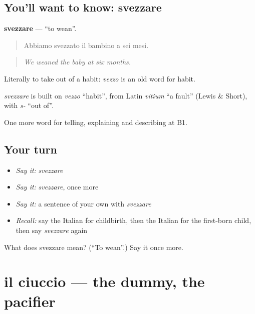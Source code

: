 \subsection*{You'll want to know: svezzare}
\textbf{svezzare} — \textquotedblleft{}to wean\textquotedblright{}.

\begin{quote}
Abbiamo svezzato il bambino a sei mesi.
\end{quote}

\begin{quote}
\emph{We weaned the baby at six months.}
\end{quote}

Literally to take out of a habit: \emph{vezzo} is an old word for habit.

\begin{cousinweb}
\emph{svezzare} is built on \emph{vezzo} \textquotedblleft{}habit\textquotedblright{}, from Latin \emph{vitium} \textquotedblleft{}a fault\textquotedblright{} (Lewis \& Short), with \emph{s-} \textquotedblleft{}out of\textquotedblright{}.
\end{cousinweb}

\begin{grammarlens}[title={What you've built}]
One more word for telling, explaining and describing at B1.
\end{grammarlens}

\subsection*{Your turn}
\begin{itemize}
\raggedright
  \item \emph{Say it:} \emph{svezzare}
  \item \emph{Say it:} \emph{svezzare}, once more
  \item \emph{Say it:} a sentence of your own with \emph{svezzare}
  \item \emph{Recall:} say the Italian for childbirth, then the Italian for the first-born child, then say \emph{svezzare} again
\end{itemize}

\begin{tcolorbox}[breakable,colback=teal!4,colframe=teal!35!black,title={Before you move on}]
What does svezzare mean? (\textquotedblleft{}To wean\textquotedblright{}.) Say it once more.
\end{tcolorbox}
\section[il ciuccio]{il ciuccio — the dummy, the pacifier}

